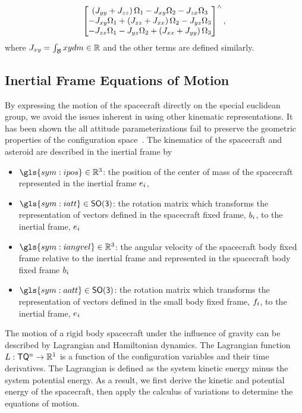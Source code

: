 \begin{align*}
    \begin{bmatrix}
        \left( J_{yy} + J_{zz} \right) \Omega_1 - J_{xy} \Omega_2 - J_{zx} \Omega_3 \\
        -J_{xy}\Omega_1 + \left( J_{zz} + J_{xx} \right) \Omega_2 - J_{yz}\Omega_3 \\
        -J_{zx}\Omega_1 - J_{yz}\Omega_2 + \left( J_{xx} + J_{yy} \right) \Omega_3
    \end{bmatrix}^\wedge,
\end{align*}
where \( J_{xy} = \int_{\mathcal{B}} xy dm \in \mathbb{R} \) and the other terms are defined similarly.

\subsection{Inertial Frame Equations of Motion}\label{sec:inertial_dumbbell_eoms}
By expressing the motion of the spacecraft directly on the special euclidean group, we avoid the issues inherent in using other kinematic representations.
It has been shown the all attitude parameterizations fail to preserve the geometric properties of the configuration space~\cite{chaturvedi2011a}.
The kinematics of the spacecraft and asteroid are described in the inertial frame by
\begin{itemize}
    \item \( \gls{sym:ipos} \in \R^3 \): the position of the center of mass of the spacecraft represented in the inertial frame \( e_{i} \),
    \item \( \gls{sym:iatt} \in \SO\): the rotation matrix which transforms the representation of vectors defined in the spacecraft fixed frame, \( b_{i} \), to the inertial frame, \( e_{i} \)
    \item \( \gls{sym:iangvel} \in \R^3 \): the angular velocity of the spacecraft body fixed frame relative to the inertial frame and represented in the spacecraft body fixed frame \( b_{i} \)
    \item \( \gls{sym:aatt} \in \SO \): the rotation matrix which transforms the representation of vectors defined in the small body fixed frame, \( f_{i} \), to the inertial frame, \( e_{i} \)
\end{itemize}

The motion of a rigid body spacecraft under the influence of gravity can be described by Lagrangian and Hamiltonian dynamics.
The Lagrangian function \( L : \mathsf{T} \mathsf{Q}^n \to \mathbb{R}^1 \) is a function of the configuration variables and their time derivatives.
The Lagrangian is defined as the system kinetic energy minus the system potential energy.
As a result, we first derive the kinetic and potential energy of the spacecraft, then apply the calculus of variations to determine the equations of motion.

